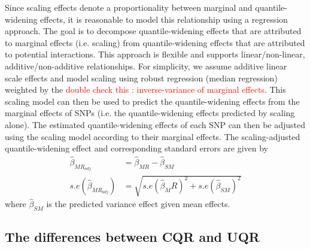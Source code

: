 \documentclass[12pt]{article}
\begin{document}
\begin{appendices}
Since scaling effects denote a proportionality between marginal and quantile-widening effects, it is reasonable to model this relationship using a regression approach. The goal is to decompose quantile-widening effects that are attributed to marginal effects (i.e. scaling) from quantile-widening effects that are attributed to potential interactions. This approach is flexible and supports linear/non-linear, additive/non-additive relationships. For simplicity, we assume additive linear scale effects and model scaling using robust regression (median regression) weighted by the \textcolor{red}{double check this : inverse-variance of marginal effects}. This scaling model can then be used to predict the quantile-widening effects from the marginal effects of SNPs (i.e. the quantile-widening effects predicted by scaling alone). The estimated quantile-widening effects of each SNP can then be adjusted using the scaling model according to their marginal effects. The scaling-adjusted quantile-widening effect and corresponding standard errors are given by
\begin{equation}
\begin{split}
\hat{\beta}_{MR_{adj}}&=\hat{\beta}_{MR} - \hat{\beta}_{SM} \\
s.e(\hat{\beta}_{MR_{adj}}) &= \sqrt{s.e(\hat{\beta}_MR)^2 + s.e(\hat{\beta}_{SM})^2}
\end{split}
\end{equation}
where $\hat{\beta}_{SM}$ is the predicted variance effect given mean effects.


\subsection{The differences between CQR and UQR}


\end{appendices}
\end{document}
